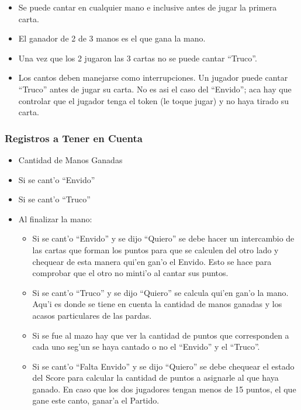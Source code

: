\begin{itemize}
\item Se puede cantar en cualquier mano e inclusive antes de jugar la primera carta.
\item El ganador de 2 de 3 manos es el que gana la mano.
\item Una vez que los 2 jugaron las 3 cartas no se puede cantar ``Truco''.
\end{itemize}


\begin{itemize}
\item Los cantos deben manejarse como interrupciones. Un jugador puede cantar ``Truco'' antes de jugar su carta. No es asi el caso del ``Envido''; aca hay que controlar que el jugador tenga el token (le toque jugar) y no haya tirado su carta.
\end{itemize}

\subsubsection{Registros a Tener en Cuenta}
\begin{itemize}
\item Cantidad de Manos Ganadas
\item Si se cant'o ``Envido''
\item Si se cant'o ``Truco''
\item Al finalizar la mano:
	\begin{itemize}
    \item Si se cant'o ``Envido'' y se dijo ``Quiero'' se debe hacer un intercambio de las cartas que forman los puntos para que se calculen del otro lado y chequear de esta manera qui'en gan'o el Envido. Esto se hace para comprobar que el otro no minti'o al cantar sus puntos.
    \item Si se cant'o ``Truco'' y se dijo ``Quiero'' se calcula qui'en gan'o la mano. Aqu'i es donde se tiene en cuenta la cantidad de manos ganadas y los acasos particulares de las pardas.
    \item Si se fue al mazo hay que ver la cantidad de puntos que corresponden a cada uno seg'un se haya cantado o no el ``Envido'' y el ``Truco''.
    \item Si se cant'o ``Falta Envido'' y se dijo ``Quiero'' se debe chequear el estado del Score para calcular la cantidad de puntos a asignarle al que haya ganado. En caso que los dos jugadores tengan menos de 15 puntos, el que gane este canto, ganar'a el Partido.
	\end{itemize}
\end{itemize}

